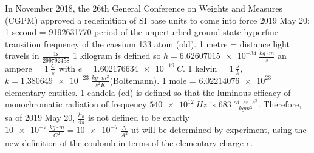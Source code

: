 In November 2018, the 26th General Conference on Weights and Measures (CGPM) approved a redefinition of SI base units to come into force 2019 May 20:
1 second = 9192631770 period of the unperturbed ground-state hyperfine transition frequency of the caesium 133 atom (old). 1 metre = distance light travels in $\frac{1 \text{s}}{299792458}$ 1 kilogram is defined so $h =\SI{6.62607015e-34}{\frac{kg \cdot m}{s}}$ an ampere = $\SI{1}{\frac{C}{s}}$ with $e = \SI{1.602176634e-19}{C}$. 1 kelvin = $\SI{1}{\frac{J}{k}}$, $k = \SI{1.380649e-23}{\frac{kg \cdot m^2}{s^2 K}}$(Boltemann). 1 mole = $\SI{6.02214076e23}$ elementary entities. 1 candela (cd) is defined so that the luminous efficacy of monochromatic radiation of frequency $\SI{540e12}{Hz}$ is $\SI{683}{\frac{cd \cdot sr \cdot s^3}{kg m^3}}$.
Therefore, sa of 2019 May 20, $\frac{\mu_0}{4\pi}$ is not defined to be exactly $\SI{10e-7}{\frac{kg \cdot m}{C^2}} = \SI{10e-7}{\frac{N}{A^2}}$ ut will be determined by experiment, using the new definition of the coulomb in terms of the elementary charge $e$. 
